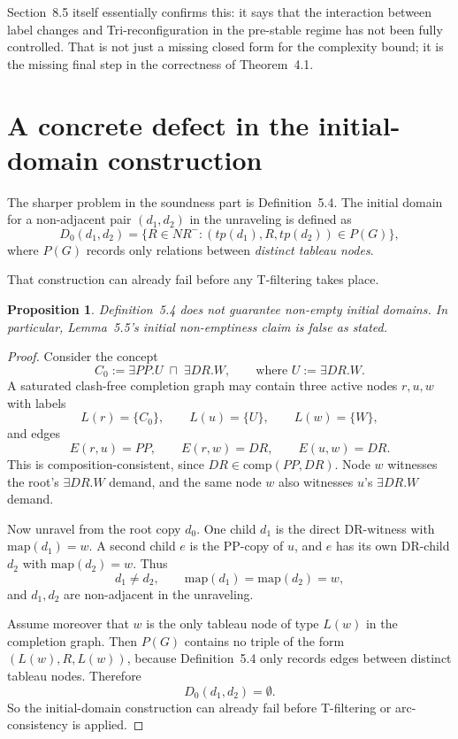 \documentclass[11pt]{article}
\newtheorem{prop}{Proposition}
\newcommand{\Dzero}{D_0}
\newcommand{\comp}{\mathrm{comp}}
\begin{document}
Section~8.5 itself essentially confirms this: it says that the interaction between label
changes and Tri-reconfiguration in the pre-stable regime has not been fully controlled.
That is not just a missing closed form for the complexity bound; it is the missing final
step in the correctness of Theorem~4.1.

\section{A concrete defect in the initial-domain construction}

The sharper problem in the soundness part is Definition~5.4. The initial domain for a
non-adjacent pair \((d_1,d_2)\) in the unraveling is defined as
\[
\Dzero(d_1,d_2)=\{R\in NR^- : (tp(d_1),R,tp(d_2))\in P(G)\},
\]
where \(P(G)\) records only relations between \emph{distinct tableau nodes}.

That construction can already fail before any T-filtering takes place.

\begin{prop}
Definition~5.4 does not guarantee non-empty initial domains. In particular,
Lemma~5.5's initial non-emptiness claim is false as stated.
\end{prop}

\begin{proof}
Consider the concept
\[
C_0 := \exists PP.U \;\sqcap\; \exists DR.W,
\qquad\text{where } U := \exists DR.W.
\]
A saturated clash-free completion graph may contain three active nodes
\(r,u,w\) with labels
\[
L(r)=\{C_0\},\qquad L(u)=\{U\},\qquad L(w)=\{W\},
\]
and edges
\[
E(r,u)=PP,\qquad E(r,w)=DR,\qquad E(u,w)=DR.
\]
This is composition-consistent, since
\(DR\in \comp(PP,DR)\).
Node \(w\) witnesses the root's \(\exists DR.W\) demand, and the same node \(w\)
also witnesses \(u\)'s \(\exists DR.W\) demand.

Now unravel from the root copy \(d_0\). One child \(d_1\) is the direct DR-witness
with \(\mathrm{map}(d_1)=w\). A second child \(e\) is the PP-copy of \(u\), and \(e\)
has its own DR-child \(d_2\) with \(\mathrm{map}(d_2)=w\). Thus
\[
d_1\neq d_2,\qquad \mathrm{map}(d_1)=\mathrm{map}(d_2)=w,
\]
and \(d_1,d_2\) are non-adjacent in the unraveling.

Assume moreover that \(w\) is the only tableau node of type \(L(w)\) in the completion
graph. Then \(P(G)\) contains no triple of the form
\((L(w),R,L(w))\), because Definition~5.4 only records edges between distinct tableau
nodes. Therefore
\[
\Dzero(d_1,d_2)=\emptyset.
\]
So the initial-domain construction can already fail before T-filtering or arc-consistency is
applied.
\end{proof}
\end{document}
